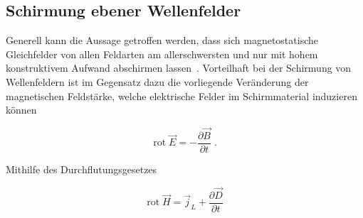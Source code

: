 \subsection{Schirmung ebener Wellenfelder}\label{cha:2_sub_Schirmung_ebener_Wellenfelder}

Generell kann die Aussage getroffen werden, dass sich magnetostatische Gleichfelder von allen Feldarten am allerschwersten und nur mit hohem konstruktivem Aufwand abschirmen lassen~\cite{EM_Schirmung}. Vorteilhaft bei der Schirmung von Wellenfeldern ist im Gegensatz dazu die vorliegende Veränderung der magnetischen Feldstärke, welche elektrische Felder im Schirmmaterial induzieren können~\cite{Maxwell}


\begin{equation}
    \text{rot} \; \vec E= - \frac{\partial \vec B}{\partial t} \; \text{.}
    \label{eq:2_Induktionsgesetz}
\end{equation}

Mithilfe des Durchflutungsgesetzes~\cite{Maxwell}

\begin{equation}
    \text{rot} \; \vec H = \vec j_L + \frac{\partial \vec D}{\partial t}
    \label{eq:2_Durchflutungsgesetz}
\end{equation}

